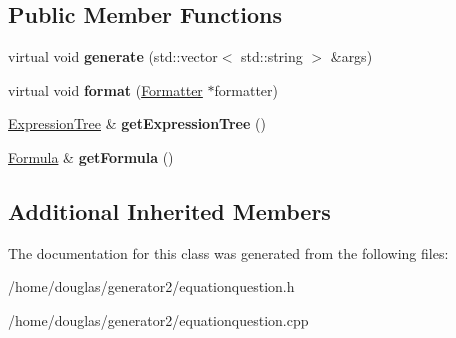 \subsection*{Public Member Functions}
\begin{DoxyCompactItemize}
\item 
virtual void {\bfseries generate} (std\+::vector$<$ std\+::string $>$ \&args)\hypertarget{classEquationQuestion_a5779f4c91db396c3db9cdf7e2b26ccfa}{}\label{classEquationQuestion_a5779f4c91db396c3db9cdf7e2b26ccfa}

\item 
virtual void {\bfseries format} (\hyperlink{classFormatter}{Formatter} $\ast$formatter)\hypertarget{classEquationQuestion_a1a6c52b71d040d7ae01166a13719e6c8}{}\label{classEquationQuestion_a1a6c52b71d040d7ae01166a13719e6c8}

\item 
\hyperlink{classExpressionTree}{Expression\+Tree} \& {\bfseries get\+Expression\+Tree} ()\hypertarget{classEquationQuestion_a2cf99e4b721119b32fca972312baebd8}{}\label{classEquationQuestion_a2cf99e4b721119b32fca972312baebd8}

\item 
\hyperlink{classFormula}{Formula} \& {\bfseries get\+Formula} ()\hypertarget{classEquationQuestion_a23040188b5055d7ed1acdde4334f0fce}{}\label{classEquationQuestion_a23040188b5055d7ed1acdde4334f0fce}

\end{DoxyCompactItemize}
\subsection*{Additional Inherited Members}


The documentation for this class was generated from the following files\+:\begin{DoxyCompactItemize}
\item 
/home/douglas/generator2/equationquestion.\+h\item 
/home/douglas/generator2/equationquestion.\+cpp\end{DoxyCompactItemize}
